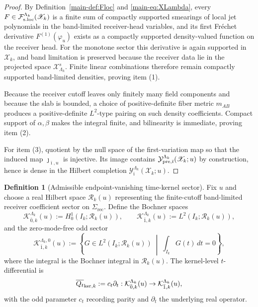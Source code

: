 \documentclass[11pt]{article}
\theoremstyle{definition}
\newtheorem{definition}{Definition}[section]
\theoremstyle{plain}
\theoremstyle{remark}
\newcommand{\Fsloc}{\mathcal F_{\rm s.loc}}
\newcommand{\Xscr}{\mathscr X}
\newcommand{\Islab}{I_k}
\newcommand{\Qt}{Q_t}
\newcommand{\rec}{\mathrm{rec}}
\begin{document}
\begin{proof}
By Definition~\ref{main-def:Floc} and \eqref{main-eq:XLambda}, every
\(F\in\Fsloc^{\Lambda_k}(\Xscr_k)\) is a finite sum of compactly supported smearings of local jet
polynomials in the band-limited receiver-head variables, and its first Fr\'echet derivative
\(F^{(1)}(\varphi_u)\) exists as a compactly supported density-valued function on the receiver head.
For the monotone sector this derivative is again supported in \(\Xscr_k\), and band limitation is
preserved because the receiver data lie in the projected space \(\mathcal X_{\Lambda_k}^s\).
Finite linear combinations therefore remain compactly supported band-limited densities, proving
item (1).

Because the receiver cutoff leaves only finitely many field components and because the slab is
bounded, a choice of positive-definite fiber metric \(m_{AB}\) produces a positive-definite
\(L^2\)-type pairing on such density coefficients.  Compact support of \(\alpha,\beta\) makes the
integral finite, and bilinearity is immediate, proving item (2).

For item (3), quotient by the null space of the first-variation map so that the induced map
\(\jmath_{\bar\imath,u}\) is injective.  Its image contains
\(\mathcal Y_{{\rm pre},\bar\imath}^{\Lambda_k}(\Xscr_k;u)\) by construction, hence is dense in the
Hilbert completion \(\mathcal Y_{\bar\imath}^{\Lambda_k}(\Xscr_k;u)\).
\end{proof}

\begin{definition}[Admissible endpoint-vanishing time-kernel sector]
\label{def:uomdesc-time-kernel-sector}
Fix \(u\) and choose a real Hilbert space \(\mathcal R_k(u)\) representing the finite-cutoff
band-limited receiver coefficient sector on \(\Sigma_{\rec}\).
Define the Bochner spaces
\[
\mathcal K_{\bar 0,k}^{\Lambda_k}(u)
:=
H_0^1(\Islab;\mathcal R_k(u)),
\qquad
\mathcal K_{\bar 1,k}^{\Lambda_k}(u)
:=
L^2(\Islab;\mathcal R_k(u)),
\]
and the zero-mode-free odd sector
\[
\mathcal K_{\bar 1,k}^{\Lambda_k,0}(u)
:=
\left\{
G\in L^2(\Islab;\mathcal R_k(u))
\;\middle|\;
\int_{\Islab}G(t)\,dt=0
\right\},
\]
where the integral is the Bochner integral in \(\mathcal R_k(u)\).
The kernel-level \(t\)-differential is
\[
\overline{\Qt}_{{\rm ker},k}
:=
c_t\partial_t:
\mathcal K_{\bar 0,k}^{\Lambda_k}(u)\to \mathcal K_{\bar 1,k}^{\Lambda_k}(u),
\]
with the odd parameter \(c_t\) recording parity and \(\partial_t\) the underlying real operator.
\end{definition}
\end{document}
